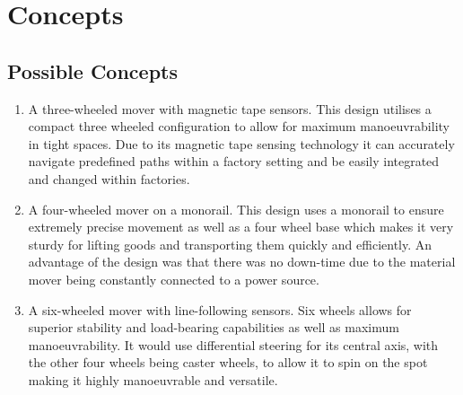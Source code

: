 \documentclass[12pt]{article}
\begin{document}
\section{Concepts}
\subsection{Possible Concepts}
 
\begin{enumerate}
    \item A three-wheeled mover with magnetic tape sensors. This design utilises a compact three wheeled configuration to allow for maximum manoeuvrability in tight spaces. Due to its magnetic tape sensing technology it can accurately navigate predefined paths within a factory setting and be easily integrated and changed within factories.
    \item A four-wheeled mover on a monorail. This design uses a monorail to ensure extremely precise movement as well as a four wheel base which makes it very sturdy for lifting goods and transporting them quickly and efficiently. An advantage of the design was that there was no down-time due to the material mover being constantly connected to a power source.
    \item A six-wheeled mover with line-following sensors. Six wheels allows for superior stability and load-bearing capabilities as well as maximum manoeuvrability. It would use differential steering for its central axis, with the other four wheels being caster wheels, to allow it to spin on the spot making it highly manoeuvrable and versatile.
 \end{enumerate}

 
\end{document}
